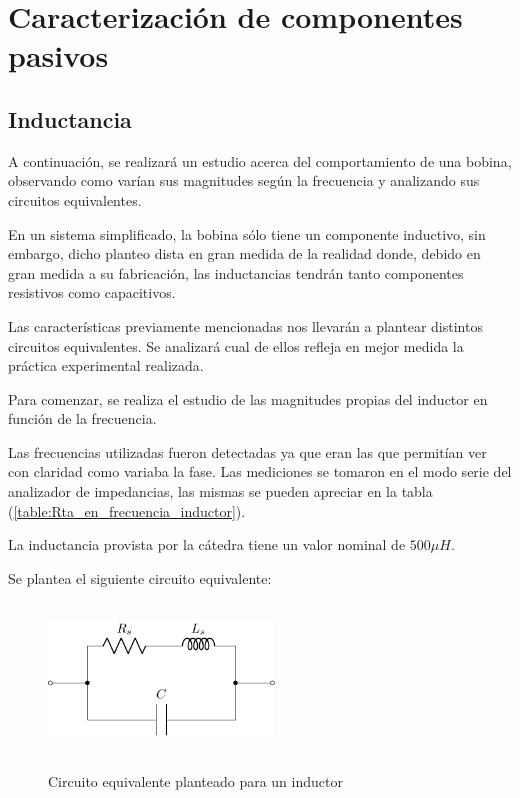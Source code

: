 \section{Caracterización de componentes pasivos}

\subsection{Inductancia}
A continuación, se realizará un estudio acerca del comportamiento de una bobina, observando como varían sus magnitudes según la frecuencia y analizando sus circuitos equivalentes.\par En un sistema simplificado, la bobina sólo tiene un componente inductivo, sin embargo, dicho planteo dista en gran medida de la realidad donde, debido en gran medida a su fabricación, las inductancias tendrán tanto componentes resistivos como capacitivos. \par Las características previamente mencionadas nos llevarán a plantear distintos circuitos equivalentes. Se analizará cual de ellos refleja en mejor medida la práctica experimental realizada.

Para comenzar, se realiza el estudio de las magnitudes propias del inductor en función de la frecuencia. \par Las frecuencias utilizadas fueron detectadas ya que eran las que permitían ver con claridad como variaba la fase. Las mediciones se tomaron en el modo serie del analizador de impedancias, las mismas se pueden apreciar en la tabla (\ref{table:Rta_en_frecuencia_inductor}).

La inductancia provista por la cátedra tiene un valor nominal de $500\mu H$.
\par
Se plantea el siguiente circuito equivalente:

\begin{figure}[H]
\centering
\includegraphics[width=6cm,height=4cm]{Ejercicio_1(Germo)/Circuitos/circuito_equivalente_inductancia.pdf}
\label{fig:circuito_equivalente_inductancia}
\caption{Circuito equivalente planteado para un inductor}
\end{figure}

